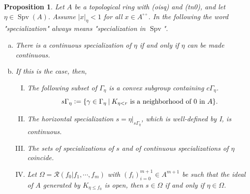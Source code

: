 \documentclass[8pt]{article}
\numberwithin{equation}{section}
\newtheorem{proposition}{Proposition}[subsection]
\DeclareMathOperator{\Spv}{Spv}
\newcommand{\defeq}{\vcentcolon=}
\newcommand{\sep}[0]{\:|\:}
\newcommand{\ab}[1]{\vert #1 \vert}
\newcommand{\cGamma}[0]{c\Gamma}
\newcommand{\dcirc}[0]{{\circ\circ}}
\begin{document}
\begin{proposition}
    \label{proposition_13_3}
    Let $A$ be a topological ring with (oisq) and (tn0), and let $\eta\in\Spv(A)$. Assume $\ab{x}_\eta<1$ for all $x\in A^{\dcirc}$. In the following the word "specialization" always means "specialization in $\Spv$".
    \begin{enumerate}[a.]
        \item There is a continuous specialization of $\eta$ if and only if $\eta$ can be made continuous. %
        \item If this is the case, then,
            \begin{enumerate}[I.]
                \item The following subset of $\Gamma_\eta$ is a convex subgroup containing $\cGamma_\eta$.
                \begin{equation*}
                    s\Gamma_\eta \defeq \{\gamma\in\Gamma_\eta\sep K_{\eta<r}\text{ is a neighborhood of $0$ in $A$}\}.
                \end{equation*}
                \item The horizontal specialization $s=\eta|_{s\Gamma_\eta}$, which is well-defined by I, is continuous.
                \item The sets of specializations of $s$ and of continuous specializations of $\eta$ coincide.
                \item Let $\Omega=\mathcal{R}(f_0|f_1,\cdots,f_m)$ with $(f_i)_{i=0}^{m+1}\in A^{m+1}$ be such that the ideal of $A$ generated by $K_{\eta\leq f_0}$ is open, then $s\in\Omega$ if and only if $\eta\in\Omega$.
            \end{enumerate}
    \end{enumerate}
\end{proposition}
\end{document}
